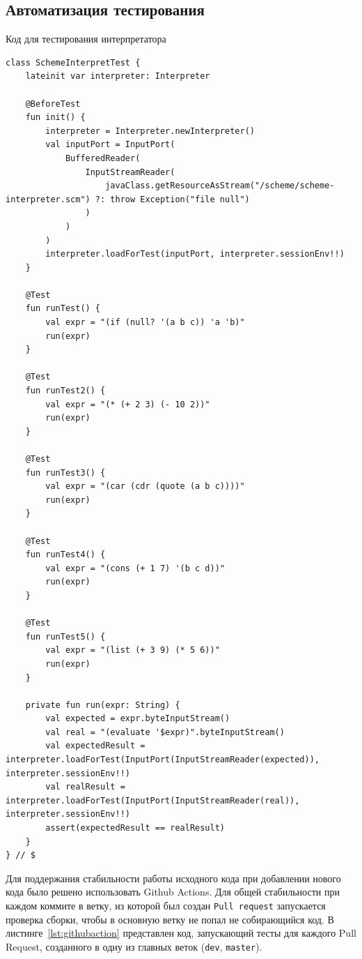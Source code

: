 \documentclass[14pt, russian]{scrartcl}
\newenvironment{longlisting}{\captionsetup{type=listing}}{}
\begin{document}
\begin{longlisting}

\subsection{Автоматизация тестирования}
\caption{Код для тестирования интерпретатора}
\label{lst:testrun}
\begin{verbatim}
class SchemeInterpretTest {
    lateinit var interpreter: Interpreter

    @BeforeTest
    fun init() {
        interpreter = Interpreter.newInterpreter()
        val inputPort = InputPort(
            BufferedReader(
                InputStreamReader(
                    javaClass.getResourceAsStream("/scheme/scheme-interpreter.scm") ?: throw Exception("file null")
                )
            )
        )
        interpreter.loadForTest(inputPort, interpreter.sessionEnv!!)
    }

    @Test
    fun runTest() {
        val expr = "(if (null? '(a b c)) 'a 'b)"
        run(expr)
    }

    @Test
    fun runTest2() {
        val expr = "(* (+ 2 3) (- 10 2))"
        run(expr)
    }

    @Test
    fun runTest3() {
        val expr = "(car (cdr (quote (a b c))))"
        run(expr)
    }

    @Test
    fun runTest4() {
        val expr = "(cons (+ 1 7) '(b c d))"
        run(expr)
    }

    @Test
    fun runTest5() {
        val expr = "(list (+ 3 9) (* 5 6))"
        run(expr)
    }

    private fun run(expr: String) {
        val expected = expr.byteInputStream()
        val real = "(evaluate '$expr)".byteInputStream()
        val expectedResult = interpreter.loadForTest(InputPort(InputStreamReader(expected)), interpreter.sessionEnv!!)
        val realResult = interpreter.loadForTest(InputPort(InputStreamReader(real)), interpreter.sessionEnv!!)
        assert(expectedResult == realResult)
    }
} // $
\end{verbatim}
\end{longlisting}

Для поддержания стабильности работы исходного кода при добавлении нового кода было решено использовать Github Actions.
Для общей стабильности при каждом коммите в ветку, из которой был создан \texttt{Pull request} запускается проверка сборки, чтобы в основную ветку не попал не собирающийся код.
В листинге~\ref{lst:githubaction} представлен код, запускающий тесты для каждого Pull Request, созданного в одну из главных веток (\texttt{dev}, \texttt{master}).
\end{document}
